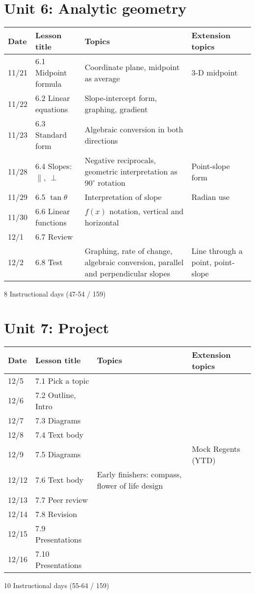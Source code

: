 \section*{Unit 6: Analytic geometry}
\begin{tabular}{|p{0.9cm}|p{4cm}|p{7cm}|p{5cm}|}
  \hline
  Date & Lesson title & Topics  & Extension topics \\
  \hline
  11/21 & 6.1 Midpoint formula & Coordinate plane, midpoint as average & 3-D midpoint \\
  \hline
  11/22 & 6.2 Linear equations & Slope-intercept form, graphing, gradient &  \\
  \hline
  11/23 & 6.3 Standard form & Algebraic conversion in both directions &  \\
  \hline
  11/28 & 6.4 Slopes: $\parallel$, $\perp$ & Negative reciprocals, geometric interpretation as $90^\circ$ rotation & Point-slope form \\
  \hline
  11/29 & 6.5 $\tan \theta$ & Interpretation of slope & Radian use \\
  \hline
  11/30 & 6.6 Linear functions & $f(x)$ notation, vertical and horizontal & \\
  \hline
  12/1 & 6.7 Review &  &  \\
  \hline
  12/2 & 6.8 Test & Graphing, rate of change, algebraic conversion, parallel and perpendicular slopes & Line through a point, point-slope \\
  \hline

\end{tabular} \par \vspace*{0.3cm}
8 Instructional days (47-54 / 159)


\section*{Unit 7: Project}
\begin{tabular}{|p{0.9cm}|p{4cm}|p{7cm}|p{5cm}|}
  \hline
  Date & Lesson title & Topics  & Extension topics \\
  \hline
  12/5 & 7.1 Pick a topic &  &  \\
  \hline
  12/6 & 7.2 Outline, Intro &  &  \\
  \hline
  12/7 & 7.3 Diagrams &  &  \\
  \hline
  12/8 & 7.4 Text body &  &  \\
  \hline
  12/9 & 7.5 Diagrams &  & Mock Regents (YTD) \\
  \hline
  12/12 & 7.6 Text body & Early finishers: compass, flower of life design &  \\
  \hline
  12/13 & 7.7 Peer review &  &  \\
  \hline
  12/14 & 7.8 Revision &  & \\
  \hline
  12/15 & 7.9 Presentations &  &  \\
  \hline
  12/16 & 7.10 Presentations &  & \\
  \hline

\end{tabular} \par \vspace*{0.3cm}
10 Instructional days (55-64 / 159)


